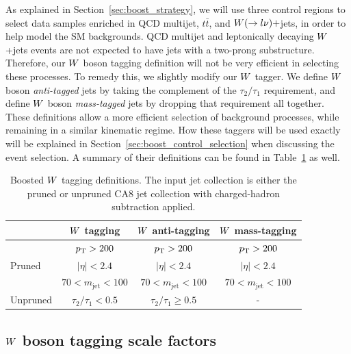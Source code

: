 As explained in Section~\ref{sec:boost_strategy}, we will use three control regions to select data
samples enriched in QCD multijet, $t\bar{t}$, and $W(\rightarrow l \nu)+$jets, in order to help
model the SM backgrounds. QCD multijet and leptonically decaying $W$+jets events are not expected
to have jets with a two-prong substructure. Therefore, our $W$ boson tagging definition will not be
very efficient in selecting these processes. To remedy this, we slightly modify our $W$ tagger. 
We define $W$ boson \textit{anti-tagged} jets by taking the complement of the $\tau_2 / \tau_1$
requirement, and define $W$ boson \textit{mass-tagged} jets by dropping that requirement all
together. 
These definitions allow a more efficient selection of background processes, while remaining in a
similar kinematic regime. How these taggers will be used exactly will be explained in
Section~\ref{sec:boost_control_selection} when discussing the event selection. A summary of their
definitions can be found in Table~\ref{tab:Wtag_definition} as well. 

\begin{table}[htdp]
\caption{Boosted $W$ tagging definitions. The input jet collection is either the pruned or unpruned
CA8 jet collection with charged-hadron subtraction applied. }
\vspace{1ex}
\centering
\begin{tabular}{l c c c}
\toprule
& $W$ tagging & $W$ anti-tagging & $W$ mass-tagging  \\
\midrule
\multirow{3}{*}{Pruned} & $p_{\mathrm{T}} > 200$  & $p_{\mathrm{T}} > 200$  & $p_{\mathrm{T}} > 200$\\
& $|\eta| < 2.4$ & $|\eta| < 2.4$ & $|\eta| < 2.4$\\
& $70 < m_{\textrm{jet}}< 100$ & $70 < m_{\textrm{jet}}< 100$ & $70 < m_{\textrm{jet}}< 100$\\
\midrule
Unpruned & $\tau_2 / \tau_1 < 0.5$ & $\tau_2 / \tau_1 \geq 0.5$ & -\\
\bottomrule
\end{tabular}
\label{tab:Wtag_definition}
\end{table}


\subsection{\texorpdfstring{$W$}{W} boson tagging scale factors \label{sec:wtag_scale_factor}}

